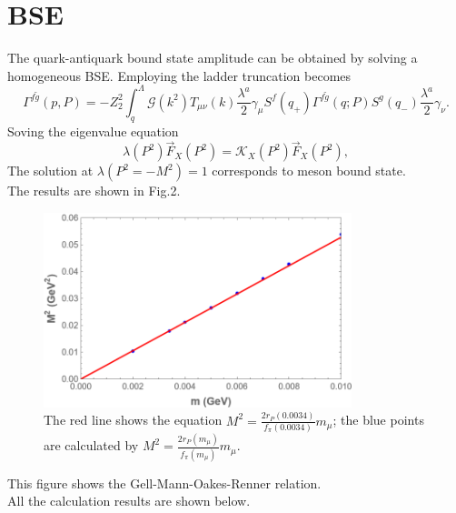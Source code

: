 \documentclass{article}
\begin{document}
\section{BSE}
The quark-antiquark bound state amplitude can be obtained by solving a homogeneous BSE. Employing the ladder truncation becomes
\begin{equation}
    \Gamma^{f\widetilde{g}}\left(p,P\right)=-Z_2^2\int_{q}^{\Lambda}\mathcal{G}\left(k^2\right)T_{\mu\nu}\left(k\right)\frac{\lambda^a}{2}\gamma_{\mu}S^f\left(q_+\right)\Gamma^{f\widetilde{g}}\left(q;P\right)S^g\left(q_-\right)\frac{\lambda^a}{2}\gamma_{\nu}.
\end{equation}
Soving the eigenvalue equation
\begin{equation}
    \lambda\left(P^2\right)\overrightarrow{F}_X\left(P^2\right)=\mathcal{K}_X\left(P^2\right)\overrightarrow{F}_X\left(P^2\right),
\end{equation}
The solution at $\lambda\left(P^2=-M^2\right)=1$ corresponds to meson bound state.\\
The results are shown in Fig.2.
\begin{figure}[H]
    \centering
    \includegraphics[width=0.8\textwidth]{pm-M^2.png}
    \caption{The red line shows the equation $M^2=\frac{2r_P(0.0034)}{f_\pi(0.0034)}m_\mu$; the blue points are calculated by $M^2=\frac{2r_P(m_\mu)}{f_\pi(m_\mu)}m_\mu$.}
\end{figure}
This figure shows the Gell-Mann-Oakes-Renner relation.\\
All the calculation results are shown below.
\end{document}
